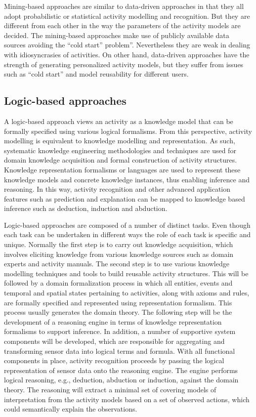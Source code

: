 Mining-based approaches are similar to data-driven approaches in that they all adopt probabilistic or statistical activity modelling and recognition. But they are different from each other in the way the parameters of the activity models are decided. The mining-based approaches make use of publicly available data sources avoiding the “cold start” problem”. Nevertheless they are weak in dealing with idiosyncrasies of activities. On other hand, data-driven approaches have the strength of generating personalized activity models, but they suffer from issues such as “cold start” and model reusability for different users.

\subsection{Logic-based approaches}

A logic-based approach views an activity as a knowledge model that can be formally specified using various logical formalisms. From this perspective, activity modelling is equivalent to knowledge modelling and representation. As such, systematic knowledge engineering methodologies and techniques are used for domain knowledge acquisition and formal construction of activity structures. Knowledge representation formalisms or languages are used to represent these knowledge models and concrete knowledge instances, thus enabling inference and reasoning. In this way, activity recognition and other advanced application features such as prediction and explanation can be mapped to knowledge based inference such as deduction, induction and abduction. 

Logic-based approaches are composed of a number of distinct tasks. Even though each task can be undertaken in different ways the role of each task is specific and unique. Normally the first step is to carry out knowledge acquisition, which involves eliciting knowledge from various knowledge sources such as domain experts and activity manuals. The second step is to use various knowledge modelling techniques and tools to build reusable activity structures. This will be followed by a domain formalization process in which all entities, events and temporal and spatial states pertaining to activities, along with axioms and rules, are formally specified and represented using representation formalism. This process usually generates the domain theory. The following step will be the development of a reasoning engine in terms of knowledge representation formalisms to support inference. In addition, a number of supportive system components will be developed, which are responsible for aggregating and transforming sensor data into logical terms and formula. With all functional components in place, activity recognition proceeds by passing the logical representation of sensor data onto the reasoning engine. The engine performs logical reasoning, e.g., deduction, abduction or induction, against the domain theory. The reasoning will extract a minimal set of covering models of interpretation from the activity models based on a set of observed actions, which could semantically explain the observations.

